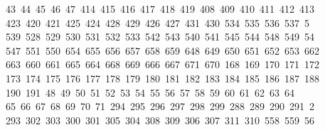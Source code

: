 \begin{tabbing}
\>\ 43\ 44\ 45\ 46\ 47\ 414\ 415\ 416\ 417\ 418\ 419\ 408\ 409\ 410\ 411\ 412\ 413\ \\[0pt]
\ 423\ 420\ 421\ 425\ 424\ 428\ 429\ 426\ 427\ 431\ 430\ 534\ 535\ 536\ 537\ 5\\[0pt]
\ 539\ 528\ 529\ 530\ 531\ 532\ 533\ 542\ 543\ 540\ 541\ 545\ 544\ 548\ 549\ 54\\[0pt]
\ 547\ 551\ 550\ 654\ 655\ 656\ 657\ 658\ 659\ 648\ 649\ 650\ 651\ 652\ 653\ 662\\[0pt]
\>\ 663\ 660\ 661\ 665\ 664\ 668\ 669\ 666\ 667\ 671\ 670\ 168\ 169\ 170\ 171\ 172\\[0pt]
\>\ 173\ 174\ 175\ 176\ 177\ 178\ 179\ 180\ 181\ 182\ 183\ 184\ 185\ 186\ 187\ 188\ \\[0pt]
\ 190\ 191\ 48\ 49\ 50\ 51\ 52\ 53\ 54\ 55\ 56\ 57\ 58\ 59\ 60\ 61\ 62\ 63\ 64\\[0pt]
\>\ 65\ 66\ 67\ 68\ 69\ 70\ 71\ 294\ 295\ 296\ 297\ 298\ 299\ 288\ 289\ 290\ 291\ 2\\[0pt]
\ 293\ 302\ 303\ 300\ 301\ 305\ 304\ 308\ 309\ 306\ 307\ 311\ 310\ 558\ 559\ 56\\[0pt]

\end{tabbing}
